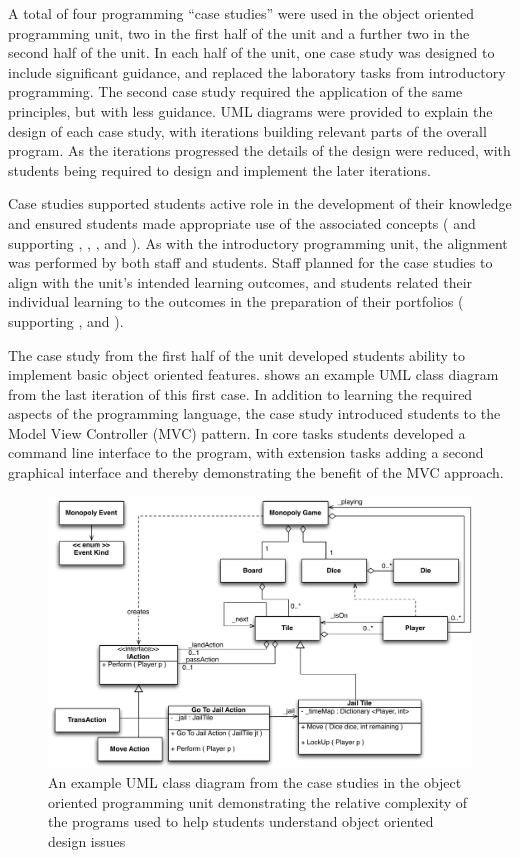 A total of four programming ``case studies'' were used in the object oriented programming unit, two in the first half of the unit and a further two in the second half of the unit. In each half of the unit, one case study was designed to include significant guidance, and replaced the laboratory tasks from introductory programming. The second case study required the application of the same principles, but with less guidance. UML diagrams were provided to explain the design of each case study, with iterations building relevant parts of the overall program. As the iterations progressed the details of the design were reduced, with students being required to design and implement the later iterations. 

Case studies supported students active role in the development of their knowledge and ensured students made appropriate use of the associated concepts ( and  supporting , , , and ). As with the introductory programming unit, the alignment was performed by both staff and students. Staff planned for the case studies to align with the unit's intended learning outcomes, and students related their individual learning to the outcomes in the preparation of their portfolios ( supporting ,  and ).

The case study from the first half of the unit developed students ability to implement basic object oriented features.  shows an example UML class diagram from the last iteration of this first case. In addition to learning the required aspects of the programming language, the case study introduced students to the Model View Controller (MVC) pattern. In core tasks students developed a command line interface to the program, with extension tasks adding a second graphical interface and thereby demonstrating the benefit of the MVC approach.

\begin{figure}[htbp]
	\centering
	\includegraphics[width=\textwidth]{Monopoly}
	\caption{An example UML class diagram from the case studies in the object oriented programming unit demonstrating the relative complexity of the programs used to help students understand object oriented design issues}
	\label{fig:monopoly}
\end{figure}

